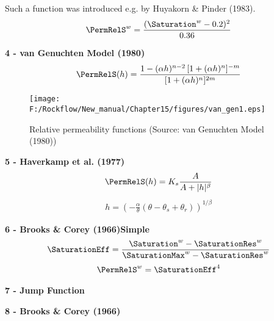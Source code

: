 Such a function was introduced e.g. by Huyakorn \& Pinder (1983).
\begin{eqnarray}
\PermRelS^w = \frac{(\Saturation^w-0.2)^2}{0.36}
\end{eqnarray}

\textbf{4 - van Genuchten Model (1980)}
\begin{eqnarray}
\PermRelS(h) = \frac{1-(\alpha h)^{n-2}\,[1+(\alpha
h)^n]^{-m}}{[1+(\alpha h)^n]^{2m}}
\end{eqnarray}

\begin{figure}[htb!]
\begin{center}
\footnotesize
\texttt{[image: F:/Rockflow/New\_manual/Chapter15/figures/van\_gen1.eps]}  %
\caption{Relative permeability functions (Source: van Genuchten
Model (1980))} \label{fig:}
\end{center}
\end{figure}
%


\textbf{5 - Haverkamp et al. (1977)}
\begin{eqnarray}
\PermRelS(h) = K_s \frac{A}{A+|h|^\beta}
\end{eqnarray}
\begin{eqnarray}
h = \left( -\frac{\alpha}{\theta} (\theta - \theta_s + \theta_r)
\right)^{1/\beta}
\end{eqnarray}



\textbf{6 - Brooks \& Corey (1966)Simple}
\begin{eqnarray}
\SaturationEff =
\frac{\Saturation^w-\SaturationRes^w}{\SaturationMax^w-\SaturationRes^w}
\end{eqnarray}
\begin{eqnarray}
\PermRelS^w = \SaturationEff^4
\end{eqnarray}

\textbf{7 - Jump Function} \vspace{5mm}

\textbf{8 - Brooks \& Corey (1966)} \vspace{5mm}


